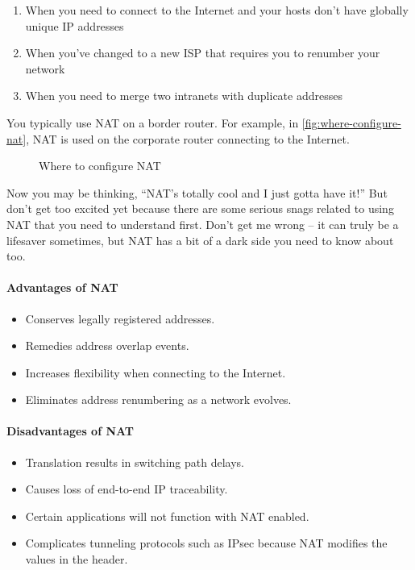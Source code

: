 \begin{enumerate}
   \item When you need to connect to the Internet and your hosts don't have   globally unique IP addresses
   \item When you've changed   to a new ISP that requires you to renumber your network
   \item When you need to merge two intranets with duplicate addresses
\end{enumerate}

You typically use NAT on a border router.
For example, in \vref{fig:where-configure-nat}, NAT is used on the corporate router connecting to the Internet.

\begin{figure}
   \caption{Where to configure NAT}
   \label{fig:where-configure-nat}
\end{figure}

Now you may be thinking, ``NAT's totally cool and I just gotta have it!''
But don't get too excited yet because there are some serious snags related to using NAT that you need to understand first.
Don't get me wrong -- it can truly be a lifesaver sometimes, but NAT has a bit of a dark side you need to know about too.

\paragraph{Advantages of NAT}
\begin{itemize}
   \item Conserves legally registered addresses.
   \item Remedies address overlap events.
   \item Increases flexibility when connecting to the Internet.
   \item Eliminates address renumbering as a network evolves.
\end{itemize}

\paragraph{Disadvantages of NAT}
\begin{itemize}
   \item Translation results in switching path delays.
   \item Causes loss of end-to-end IP traceability.
   \item Certain applications will not function with NAT enabled.
   \item Complicates tunneling protocols such as IPsec because NAT modifies the values in the header.
\end{itemize}


